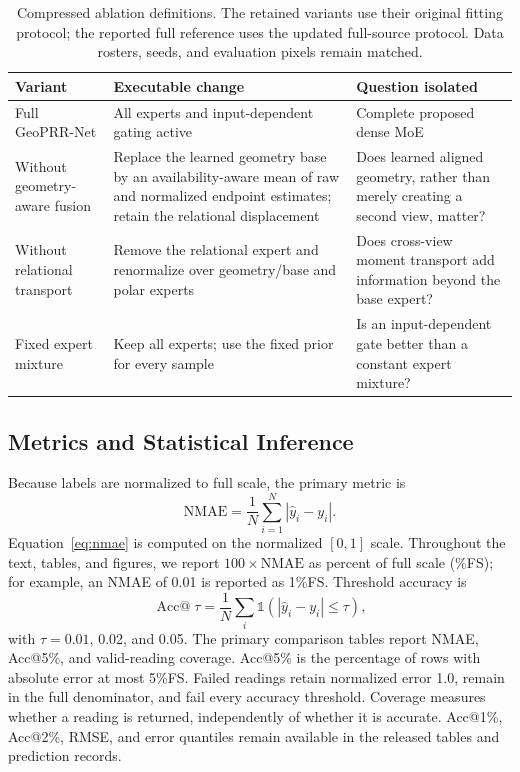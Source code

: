 \documentclass[electronics,article,submit,oneauthor]{Definitions/mdpi}
\newcommand{\modelname}{GeoPRR-Net\xspace}
\newcommand{\nmae}{\mathrm{NMAE}}
\begin{document}
\begin{table}[H]
\caption{Compressed ablation definitions. The retained variants use their original fitting protocol; the reported full reference uses the updated full-source protocol. Data rosters, seeds, and evaluation pixels remain matched.}
\label{tab:ablation_definitions}
\centering
\small
\begin{tabularx}{\textwidth}{@{}>{\raggedright\arraybackslash}p{}>{\raggedright\arraybackslash}p{}X@{}}
\toprule
\textbf{Variant} & \textbf{Executable change} & \textbf{Question isolated} \\
\midrule
Full \modelname & All experts and input-dependent gating active & Complete proposed dense MoE \\
Without geometry-aware fusion & Replace the learned geometry base by an availability-aware mean of raw and normalized endpoint estimates; retain the relational displacement & Does learned aligned geometry, rather than merely creating a second view, matter? \\
Without relational transport & Remove the relational expert and renormalize over geometry/base and polar experts & Does cross-view moment transport add information beyond the base expert? \\
Fixed expert mixture & Keep all experts; use the fixed prior for every sample & Is an input-dependent gate better than a constant expert mixture? \\
\bottomrule
\end{tabularx}
\end{table}

\subsection{Metrics and Statistical Inference}
\label{subsec:statistics}

Because labels are normalized to full scale, the primary metric is
\begin{equation}
\nmae=\frac{1}{N}\sum_{i=1}^{N}|\widehat{y}_i-y_i|.
\label{eq:nmae}
\end{equation}
Equation~\eqref{eq:nmae} is computed on the normalized $[0,1]$ scale. Throughout the text, tables, and figures, we report $100\times\nmae$ as percent of full scale (\%FS); for example, an NMAE of 0.01 is reported as 1\%FS. Threshold accuracy is
\begin{equation}
\operatorname{Acc@}\tau=\frac{1}{N}\sum_i\mathbb{1}(|\widehat{y}_i-y_i|\leq\tau),
\label{eq:accuracy}
\end{equation}
with $\tau=0.01$, 0.02, and 0.05. The primary comparison tables report NMAE, Acc@5\%, and valid-reading coverage. Acc@5\% is the percentage of rows with absolute error at most 5\%FS. Failed readings retain normalized error 1.0, remain in the full denominator, and fail every accuracy threshold. Coverage measures whether a reading is returned, independently of whether it is accurate. Acc@1\%, Acc@2\%, RMSE, and error quantiles remain available in the released tables and prediction records.
\end{document}
